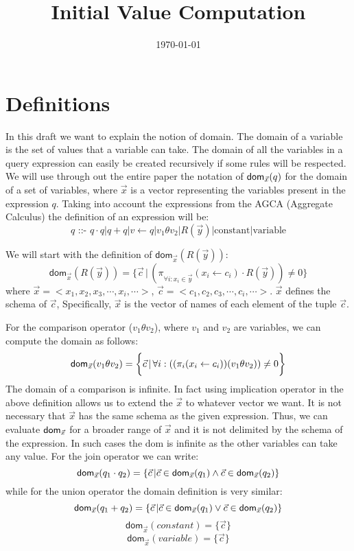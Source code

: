 \documentclass[12pt]{article}
\begin{document}
\title{Initial Value Computation}
\author{}
\date{\today}
\maketitle
\newcommand{\dom}{\textsf{dom}}

\section{Definitions}
In this draft we want to explain the notion of domain. The domain of a variable is the set of values that a variable can take. The domain of all the variables in a query expression can easily be created recursively if some rules will be respected. We will use through out the entire paper the notation of $\text{\dom{}}_{\vec x}(q)$ for the domain of a set of variables, where $\vec x$ is a vector representing the variables present in the expression $q$. Taking into account the expressions from the AGCA (Aggregate Calculus\cite{1}) the definition of an expression will be: 
$$q\text{ ::- }q\cdot q | q + q|v \gets q |v_{1}\theta v_{2}|R(\vec{y})|\text{constant}|\text{variable}$$

We will start with the definition of $\dom{}_{\vec x}(R(\vec y))$:
$$\dom{}_{\vec x}(R(\vec y))=\bigg\{\vec c\,|\,(\pi_{\forall i:x_{i}\in \vec y}^{}(x_{i}\gets c_{i})\cdot R(\vec y))\not= 0\bigg\} $$where $\vec x=<x_1,x_2,x_3,\cdots,x_i,\cdots>$, $\vec c=<c_1,c_2,c_3,\cdots,c_i,\cdots>$.  $\vec{x}$ defines the schema of $\vec{c}$, Specifically, $\vec{x}$ is the vector of names of each element of the tuple $\vec{c}$. \par

For the comparison operator ($v_{1}\theta v_{2}$), where $v_1$ and $v_2$ are variables, we can compute the domain as follows:
\begin{equation*}
\text{\dom{}}_{\vec{x}}(v_{1}\theta v_{2})=\bigg\{\vec{c}\,|\,\forall i:((\pi_{i}(x_{i}\gets c_{i}))(v_{1}\theta v_{2}))\not= 0\bigg\}
\end{equation*}
The domain of a comparison is infinite. 
In fact using implication operator in the above definition allows us to extend the $\vec{x}$ to whatever vector we want. It is not necessary that $\vec{x}$  has the same schema as the given expression. Thus, we can evaluate $\text{\dom}_{\vec{x}}$ for a broader range of $\vec{x}$ and it is not delimited by the schema of the expression. In such cases the \dom{} is infinite as the other variables can take any value.
For the join operator we can write:
\begin{equation*}
\text{\dom{}}_{\vec{x}}(q_{1}\cdot q_{2})=\{\vec{c}\,|\vec{c}\in\text{\dom{}}_{\vec{x}}(q_{1})\land\vec{c}\in\text{\dom{}}_{\vec{x}}(q_{2})\}
\end{equation*}
while for the union operator the domain definition is very similar:
\begin{equation*}
\text{\dom{}}_{\vec{x}}(q_{1}+ q_{2})=\{\vec{c}\,|\vec{c}\in\text{\dom{}}_{\vec{x}}(q_{1})\lor\vec{c}\in\text{\dom{}}_{\vec{x}}(q_{2})\}
\end{equation*}
$$\dom{}_{\vec x}(constant)=\Big\{\vec c\Big\}$$
$$\dom{}_{\vec x}(variable)=\Big\{\vec c\Big\}$$
\end{document}
